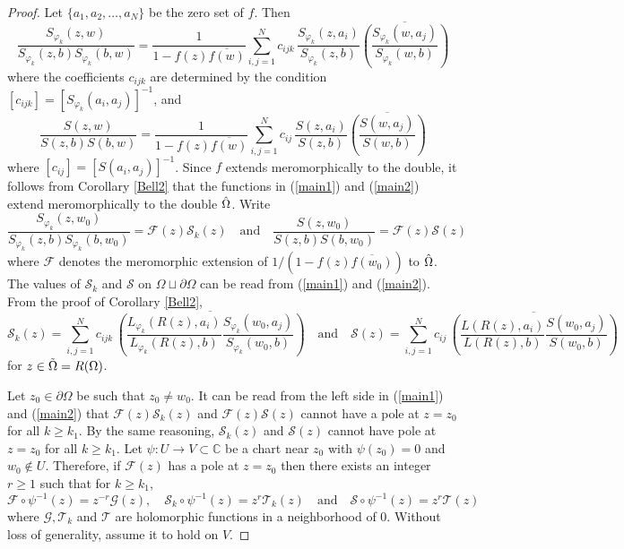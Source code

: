 \documentclass[11pt, reqno]{amsart}
\numberwithin{equation}{section}
\begin{document}
\begin{proof}
Let $\{a_1,a_2,\ldots,a_N\}$ be the zero set of $f$. Then
\begin{equation}\label{main1}
\frac{S_{\varphi_k}(z,w)}{S_{\varphi_k}(z,b)S_{\varphi_k}(b,w)} 
=
\frac{1}{1-f(z)\overline{f(w)}} \sum_{i,j=1}^N c_{ijk}\, \frac{S_{\varphi_k}(z,a_i)}{S_{\varphi_k}(z,b)} \overline{\left(\frac{S_{\varphi_k}(w,a_j)}{S_{\varphi_k}(w,b)}\right)}  
\end{equation}
where the coefficients $c_{ijk}$ are determined by the condition $[c_{ijk}]=[S_{\varphi_k}(a_i,a_j)]^{-1}$, and
\begin{equation}\label{main2}
\frac{S(z,w)}{S(z,b)S(b,w)} 
=
\frac{1}{1-f(z)\overline{f(w)}} \sum_{i,j=1}^N c_{ij}\, \frac{S(z,a_i)}{S(z,b)} \overline{\left(\frac{S(w,a_j)}{S(w,b)}\right)} 
\end{equation}
where $[c_{ij}]=[S(a_i,a_j)]^{-1}$. Since $f$ extends meromorphically to the double, it follows from Corollary \ref{Bell2} that the functions in (\ref{main1}) and (\ref{main2}) extend meromorphically to the double $\Hat{\Omega}$. Write
\[
\frac{S_{\varphi_k}(z,w_0)}{S_{\varphi_k}(z,b)S_{\varphi_k}(b,w_0)} 
= \mathcal{F}(z) \mathcal{S}_k(z) 
\quad \text{and} \quad
\frac{S(z,w_0)}{S(z,b)S(b,w_0)} 
= \mathcal{F}(z) \mathcal{S}(z) 
\]
where $\mathcal{F}$ denotes the meromorphic extension of $1/(1-f(z)\overline{f(w_0)})$ to $\Hat{\Omega}$. The values of $\mathcal{S}_k$ and $\mathcal{S}$ on $\Omega \sqcup \partial\Omega$ can be read from (\ref{main1}) and (\ref{main2}). 
From the proof of Corollary \ref{Bell2},
\[
\mathcal{S}_k(z) = \sum_{i,j=1}^N c_{ijk}\, \overline{\left(\frac{L_{\varphi_k}(R(z),a_i)}{L_{\varphi_k}(R(z),b)}
\frac{S_{\varphi_k}(w_0,a_j)}{S_{\varphi_k}(w_0,b)}\right)}
\quad \text{and}\quad
\mathcal{S}(z) = \sum_{i,j=1}^N c_{ij}\, \overline{\left(\frac{L(R(z),a_i)}{L(R(z),b)}
\frac{S(w_0,a_j)}{S(w_0,b)}\right)}
\]
for $z\in\Tilde{\Omega} = R(\Omega)$.

\medskip

Let $z_0\in\partial\Omega$ be such that $z_0\neq w_0$. It can be read from the left side in (\ref{main1}) and (\ref{main2}) that $\mathcal{F}(z)\mathcal{S}_k(z)$ and $\mathcal{F}(z)\mathcal{S}(z)$ cannot have a pole at $z=z_0$ for all $k\geq k_1$. By the same reasoning, $\mathcal{S}_k(z)$ and $\mathcal{S}(z)$ cannot have pole at $z=z_0$ for all $k\geq k_1$. Let $\psi: U\rightarrow V\subset\mathbb{C}$ be a chart near $z_0$ with $\psi(z_0)=0$ and $w_0\notin U$.
Therefore, if $\mathcal{F}(z)$ has a pole at $z=z_0$ then there exists an integer $r \ge 1$ such that for $k\geq k_1$,
\[
\mathcal{F}\circ \psi^{-1}(z) = z^{-r}\mathcal{G}(z), \quad
\mathcal{S}_k\circ \psi^{-1}(z) = z^{r} \mathcal{T}_k(z) \quad \text{and} \quad 
\mathcal{S}\circ\psi^{-1}(z) = z^{r} \mathcal{T}(z)
\]
where $\mathcal{G}, \mathcal{T}_k$ and $\mathcal{T}$ are holomorphic functions in a neighborhood of $0$. Without loss of generality, assume it to hold on $V$. 


\end{proof}
\end{document}
